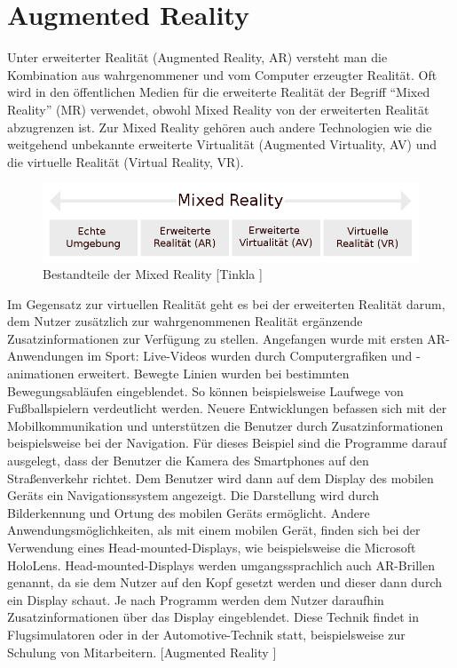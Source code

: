 \documentclass[11pt, titlepage, fleqn]{report}
\begin{document}
        \section{Augmented Reality}
        \label{sec:2.1}
            Unter erweiterter Realität (Augmented Reality, AR) versteht man die 
            Kombination aus wahrgenommener und vom Computer erzeugter Realität.
            Oft wird in den öffentlichen Medien für die erweiterte Realität der Begriff “Mixed Reality” (MR) verwendet, obwohl Mixed Reality von der erweiterten 
            Realität abzugrenzen ist. Zur Mixed Reality gehören auch andere Technologien wie die weitgehend unbekannte erweiterte Virtualität (Augmented Virtuality, 
            AV) und die virtuelle Realität (Virtual Reality, VR).
            \begin{figure}[htbp]
                \centering
                \includegraphics[width=\linewidth]{./img/Mixed_Reality.png}
                \caption[Bestandteile der Mixed Reality]{Bestandteile der Mixed Reality [Tinkla \cite{MR}] \label{fig:MRPic}}
            \end{figure}
            \newline Im Gegensatz zur virtuellen Realität geht es bei der erweiterten Realität darum, dem Nutzer zusätzlich zur wahrgenommenen Realität ergänzende 
            Zusatzinformationen zur Verfügung zu stellen.
            Angefangen wurde mit ersten AR-Anwendungen im Sport: Live-Videos wurden durch Computergrafiken und -animationen erweitert. 
            Bewegte Linien wurden bei bestimmten Bewegungsabläufen eingeblendet. So können beispielsweise Laufwege von Fußballspielern verdeutlicht werden.
            \newline Neuere Entwicklungen befassen sich mit der Mobilkommunikation und unterstützen die Benutzer durch Zusatzinformationen beispielsweise bei der Navigation.
            Für dieses Beispiel sind die Programme darauf ausgelegt, dass der 
            Benutzer die Kamera des Smartphones auf den Straßenverkehr richtet. 
            Dem Benutzer wird 
            dann auf dem Display des mobilen Geräts ein Navigationssystem angezeigt. Die Darstellung wird durch Bilderkennung und Ortung des mobilen Geräts ermöglicht.
            Andere Anwendungsmöglichkeiten, als mit einem mobilen Gerät, finden sich bei der Verwendung eines Head-mounted-Displays, wie beispielsweise die Microsoft 
            HoloLens.\newline
            Head-mounted-Displays werden umgangssprachlich auch AR-Brillen genannt, da sie dem Nutzer auf den Kopf gesetzt werden und dieser dann durch ein Display 
            schaut. Je nach Programm werden dem Nutzer daraufhin 
            Zusatzinformationen über das Display eingeblendet. Diese Technik 
            findet in Flugsimulatoren oder in der 
            Automotive-Technik statt, beispielsweise zur Schulung von 
            Mitarbeitern.  [Augmented Reality \cite{AR}]
\end{document}
